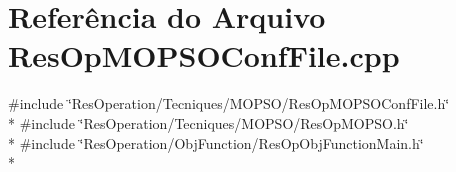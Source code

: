 \section{Referência do Arquivo Res\+Op\+M\+O\+P\+S\+O\+Conf\+File.\+cpp}
\label{_tecniques_2_m_o_p_s_o_2_res_op_m_o_p_s_o_conf_file_8cpp}
{\ttfamily \#include \char`\"{}Res\+Operation/\+Tecniques/\+M\+O\+P\+S\+O/\+Res\+Op\+M\+O\+P\+S\+O\+Conf\+File.\+h\char`\"{}}\\*
{\ttfamily \#include \char`\"{}Res\+Operation/\+Tecniques/\+M\+O\+P\+S\+O/\+Res\+Op\+M\+O\+P\+S\+O.\+h\char`\"{}}\\*
{\ttfamily \#include \char`\"{}Res\+Operation/\+Obj\+Function/\+Res\+Op\+Obj\+Function\+Main.\+h\char`\"{}}\\*
